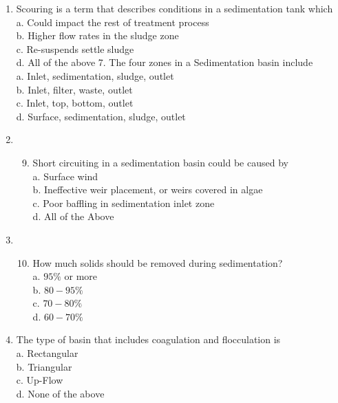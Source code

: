 \documentclass[10pt]{article}
\begin{document}
\begin{enumerate}
  \item Scouring is a term that describes conditions in a sedimentation tank which\\
a. Could impact the rest of treatment process\\
b. Higher flow rates in the sludge zone\\
c. Re-suspends settle sludge\\
d. All of the above 7. The four zones in a Sedimentation basin include\\
a. Inlet, sedimentation, sludge, outlet\\
b. Inlet, filter, waste, outlet\\
c. Inlet, top, bottom, outlet\\
d. Surface, sedimentation, sludge, outlet

  \item 
  \begin{enumerate}
    \setcounter{enumii}{8}
    \item Short circuiting in a sedimentation basin could be caused by\\
a. Surface wind\\
b. Ineffective weir placement, or weirs covered in algae\\
c. Poor baffling in sedimentation inlet zone\\
d. All of the Above
  \end{enumerate}
  \item 
  \begin{enumerate}
    \setcounter{enumii}{9}
    \item How much solids should be removed during sedimentation?\\
a. $95 \%$ or more\\
b. $80-95 \%$\\
c. $70-80 \%$\\
d. $60-70 \%$
  \end{enumerate}
  \item The type of basin that includes coagulation and flocculation is\\
a. Rectangular\\
b. Triangular\\
c. Up-Flow\\
d. None of the above

\end{enumerate}
\end{document}
